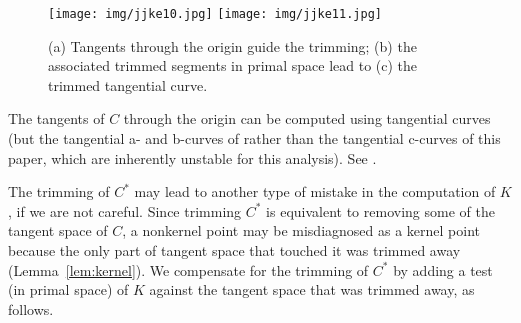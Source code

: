 \documentclass[12pt]{article}
\begin{document}
\begin{figure}[h]
\begin{center}
\texttt{[image: img/jjke10.jpg]}
\hspace{.3in}
\texttt{[image: img/jjke11.jpg]}
\end{center}
\caption{(a) Tangents through the origin guide the trimming;
	 (b) the associated trimmed segments in primal space lead to 
	 (c) the trimmed tangential curve.}
\label{fig:trim}
\end{figure}

The tangents of $C$ through the origin can be computed
using tangential curves (but the tangential a- and b-curves
of \cite{jj02} rather than the tangential c-curves of this paper,
which are inherently unstable for this analysis).
See \cite{jj02hull}.




The trimming of $C^*$ may lead to another type of mistake in the computation
of $K$, if we are not careful.
Since trimming $C^*$ is equivalent to removing some of the tangent space of $C$,
a nonkernel point may be misdiagnosed as a kernel point because the only
part of tangent space that touched it was trimmed away (Lemma~\ref{lem:kernel}).
We compensate for the trimming of $C^*$
by adding a test (in primal space) of $K$ against the tangent space that was trimmed away,
as follows.

\end{document}
